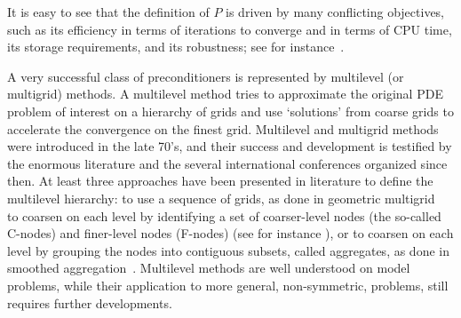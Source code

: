\documentclass{article}[11pt]
\begin{document}
It is easy to see that the definition of $P$ is driven by many conflicting
objectives, such as its efficiency in terms of iterations to converge and in
terms of CPU time, its storage requirements, and its robustness; see for
instance~\cite{golub97closer,vorst95parallel}. 

\smallskip

A very successful class of preconditioners is represented by multilevel (or
multigrid) methods.
A multilevel method tries to approximate
the original PDE problem of interest on a hierarchy of grids and use
`solutions' from coarse grids to accelerate the convergence
on the finest grid.  
Multilevel and multigrid methods were introduced in the late 70's, and their
success and development is testified by the enormous literature and the several
international conferences organized since then. 
At least three
approaches have been presented in literature to define the multilevel
hierarchy:
to use a sequence of grids, as done in geometric multigrid~\cite{brandt.classic,hack.book,hack2.book}
to coarsen on each level by identifying a set of coarser-level nodes
(the so-called C-nodes) and finer-level nodes (F-nodes) 
(see for instance \cite{Briggs,WHackbusch_1985a}), or 
to coarsen on each level by grouping the nodes into contiguous subsets,
called aggregates, as done in smoothed 
aggregation~\cite{vanek1,vanek2,vanek3}.
Multilevel methods are well understood on model problems, while their
application to more general, non-symmetric, problems, still requires
further developments.

\smallskip

\end{document}
